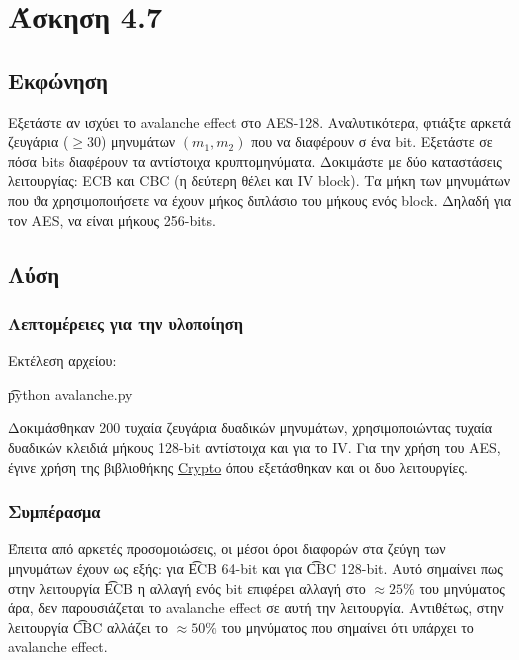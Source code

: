 \section{Άσκηση 4.7}

\subsection{Εκφώνηση}

Εξετάστε αν ισχύει το avalanche effect στο AES-128. Αναλυτικότερα, φτιάξτε αρκετά ζευγάρια ($\ge 30$) μηνυμάτων $(m_1, m_2)$ που να διαφέρουν σ ένα bit. Εξετάστε σε πόσα bits διαφέρουν τα αντίστοιχα κρυπτομηνύματα. Δοκιμάστε με δύο καταστάσεις λειτουργίας: ECB και CBC (η δεύτερη θέλει και IV block). Τα μήκη των μηνυμάτων που ϑα χρησιμοποιήσετε να έχουν μήκος διπλάσιο του μήκους ενός block. Δηλαδή για τον AES, να είναι μήκους 256-bits.

\subsection{Λύση} 

\subsubsection{Λεπτομέρειες για την υλοποίηση}

Εκτέλεση αρχείου:

\begin{center}
    \t{python avalanche.py}
\end{center}

Δοκιμάσθηκαν 200 τυχαία ζευγάρια δυαδικών μηνυμάτων, χρησιμοποιώντας τυχαία δυαδικών κλειδιά μήκους 128-bit αντίστοιχα και για το IV. Για την χρήση του AES, έγινε χρήση της βιβλιοθήκης \href{https://pypi.org/project/pycryptodome/}{Crypto} όπου εξετάσθηκαν και οι δυο λειτουργίες.

\subsubsection{Συμπέρασμα}

Έπειτα από αρκετές προσομοιώσεις, οι μέσοι όροι διαφορών στα ζεύγη των μηνυμάτων έχουν ως εξής: για \t{ECB} 64-bit και για \t{CBC} 128-bit. Αυτό σημαίνει πως στην λειτουργία \t{ECB} η αλλαγή ενός bit επιφέρει αλλαγή στο $\approx 25\%$ του μηνύματος άρα, δεν παρουσιάζεται το avalanche effect σε αυτή την λειτουργία. Αντιθέτως, στην λειτουργία \t{CBC} αλλάζει το $\approx 50\%$ του μηνύματος που σημαίνει ότι υπάρχει το avalanche effect.



